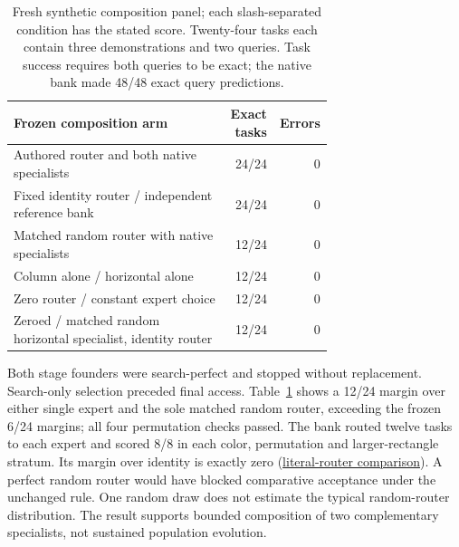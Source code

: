 \documentclass[11pt]{article}
\begin{document}
\begin{table}[!htbp]
\centering\small
\begin{tabular}{@{}p{0.70\linewidth}rr@{}}
\toprule
Frozen composition arm & Exact tasks & Errors\\
\midrule
Authored router and both native specialists & 24/24 & 0\\
Fixed identity router / independent reference bank & 24/24 & 0\\
Matched random router with native specialists & 12/24 & 0\\
Column alone / horizontal alone & 12/24 & 0\\
Zero router / constant expert choice & 12/24 & 0\\
Zeroed / matched random horizontal specialist, identity router & 12/24 & 0\\
\bottomrule
\end{tabular}
\caption{Fresh synthetic composition panel; each slash-separated condition has the stated
score. Twenty-four tasks each contain three demonstrations and two queries. Task success requires
both queries to be exact; the native bank made 48/48 exact query predictions.}
\label{tab:nativecomposition}
\end{table}

Both stage founders were search-perfect and stopped without replacement. Search-only selection
preceded final access. Table~\ref{tab:nativecomposition} shows a 12/24 margin over either single
expert and the sole matched random router, exceeding the frozen 6/24 margins; all four
permutation checks passed. The bank routed twelve tasks to each expert and scored 8/8 in each
color, permutation and larger-rectangle stratum. Its margin over identity is exactly zero
(\href{https://github.com/Sanokei/CellForge/blob/02beaf18251fca5ed1f1eb55e92f00a3e3820e88/runs/weights-native-composition01-20261006/HOST_EVALUATION/ROUTER_IDENTITY_COMPARISON.json}{literal-router comparison}).
A perfect random router would have blocked comparative acceptance under the unchanged rule.
One random draw does not estimate the typical random-router distribution. The result supports
bounded composition of two complementary specialists, not sustained population evolution.
\end{document}
